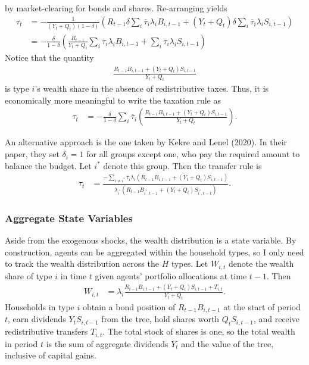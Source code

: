 \documentclass[12 pt, oneside]{article}
\theoremstyle{definition}
\theoremstyle{definition}
\theoremstyle{definition}
\begin{document}
by market-clearing for bonds and shares. Re-arranging yields
\begin{align*}
  \tau_t & = -\frac{1}{(Y_t + Q_t)(1 - \delta)}\left(R_{t - 1}\delta\sum_i \overline{\tau}_i \lambda_i B_{i, t - 1} + (Y_t + Q_t)\delta\sum_i \overline{\tau}_i\lambda_iS_{i, t - 1}\right)\\
         & = -\frac{\delta}{1 - \delta}\left(\frac{R_{t - 1}}{Y_t + Q_t}\sum_i \overline{\tau}_i \lambda_i B_{i, t - 1} + \sum_i \overline{\tau}_i\lambda_iS_{i, t - 1}\right)
\end{align*}
Notice that the quantity
\begin{align*}
  \frac{R_{t - 1}B_{i, t - 1} + (Y_t + Q_t)S_{i, t - 1}}{Y_t + Q_t}
\end{align*}
is type $i$'s wealth share in the absence of redistributive taxes. Thus, it is economically more meaningful to write the taxation rule as
\begin{align}\label{eq:common tax rate}
  \tau_t & = -\frac{\delta}{1 - \delta}\sum_i\overline{\tau}_i\left(\frac{R_{t - 1}B_{i, t - 1} + (Y_t + Q_t)S_{i, t - 1}}{Y_t + Q_t}\right).
\end{align}

An alternative approach is the one taken by Kekre and Lenel (2020). In their paper, they set $\delta_i = 1$ for all groups except one, who pay the required amount to balance the budget. Let $i^*$ denote this group. Then the transfer rule is
\begin{align}\label{eq:common tax rate one group clears}
  \tau_t & = \frac{-\sum_{i \neq i^*} \overline{\tau}_i \lambda_i(R_{t - 1}B_{i, t - 1} + (Y_t + Q_t) S_{i, t - 1})}{\lambda_{i^*}(R_{t - 1}B_{i^*, t - 1} + (Y_t + Q_t)S_{i^*, t - 1} )}.
\end{align}



\subsubsection{Aggregate State Variables}
Aside from the exogenous shocks, the wealth distribution is a state variable. By construction, agents can be aggregated within the household types, so I only need to track the wealth distribution across the $H$ types. Let $W_{i, t}$ denote the wealth share of type $i$ in time $t$ given agents' portfolio allocations at time $t - 1$. Then
\begin{align}\label{eq:wealth share defn}
  W_{i, t} & = \lambda_i\frac{R_{t - 1}B_{i, t - 1} + (Y_t + Q_t) S_{i, t - 1} + T_{i, t}}{Y_t + Q_t}.
\end{align}
Households in type $i$ obtain a bond position of $R_{t - 1} B_{i, t - 1}$ at the start of period $t$,
earn dividends $Y_t S_{i, t - 1}$ from the tree, hold shares worth $Q_t S_{i, t - 1}$, and receive redistributive transfers $T_{i, t}$.
The total stock of shares is one, so the total wealth in period $t$ is the sum of aggregate dividends $Y_t$ and the value of the tree, inclusive of capital gains.
\end{document}
